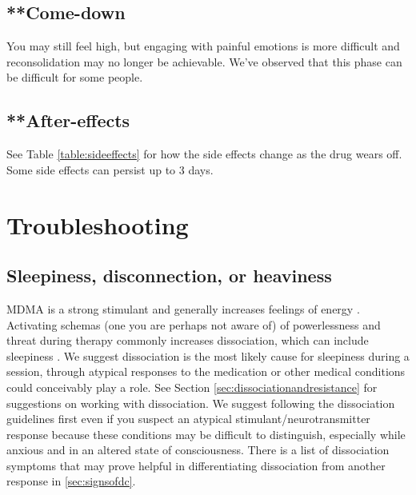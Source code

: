 \documentclass[12pt,letterpaper]{book}
\begin{document}
\subsection*{**Come-down} You may still feel high, but engaging with painful emotions is more difficult and reconsolidation may no longer be achievable. We've observed that this phase can be difficult for some people. 

\subsection*{**After-effects}
See Table \ref{table:sideeffects} for how the side effects change as the drug wears off. Some side effects can persist up to 3 days.

\section{Troubleshooting}
\label{sec:troubleshooting}
\subsection*{Sleepiness, disconnection, or heaviness}
MDMA is a strong stimulant and generally increases feelings of energy \cite{vizeliActuteEffects}. Activating schemas (one you are perhaps not aware of) of powerlessness and threat during therapy commonly increases dissociation, which can include sleepiness \cite{kozlowskaDefenseCascade}. We suggest dissociation is the most likely cause for sleepiness during a session, through atypical responses to the medication or other medical conditions could conceivably play a role. See Section \ref{sec:dissociationandresistance} for suggestions on working with dissociation. We suggest following the dissociation guidelines first even if you suspect an atypical stimulant/neurotransmitter response because these conditions may be difficult to distinguish, especially while anxious and in an altered state of consciousness. There is a list of dissociation symptoms that may prove helpful in differentiating dissociation from another response in \ref{sec:signsofdc}.
\end{document}
